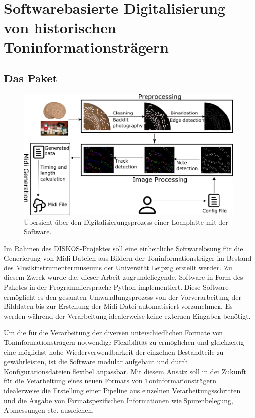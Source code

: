 \FloatBarrier

\section{Softwarebasierte Digitalisierung von historischen Toninformationsträgern}

\subsection{Das  Paket}

\begin{figure}[t]
    \centering
    \includegraphics[width=\textwidth]{graphics/flow_diagram.png}
    \caption{Übersicht über den Digitalisierungsprozess einer Lochplatte mit der  Software.}
    \label{softwareworkflow}
\end{figure}

Im Rahmen des DISKOS-Projektes soll eine einheitliche Softwarelösung für die Generierung von Midi-Dateien aus Bildern der Toninformationsträger im Bestand des Musikinstrumentenmuseums der Universität Leipzig erstellt werden.
Zu diesem Zweck wurde die, dieser Arbeit zugrundeliegende, Software in Form des  Paketes in der Programmiersprache Python \parencite[]{van1995python} implementiert.
Diese Software ermöglicht es den gesamten Umwandlungsprozess von der Vorverarbeitung der Bilddaten bis zur Erstellung der Midi-Datei automatisiert vorzunehmen.
Es werden während der Verarbeitung idealerweise keine externen Eingaben benötigt.

Um die für die Verarbeitung der diversen unterschiedlichen Formate von Toninformationsträgern notwendige Flexibilität zu ermöglichen und gleichzeitig eine möglichst hohe Wiederverwendbarkeit der einzelnen Bestandteile zu gewährleisten, ist die Software modular aufgebaut und durch Konfigurationsdateien flexibel anpassbar.
Mit diesem Ansatz soll in der Zukunft für die Verarbeitung eines neuen Formats von Toninformationsträgern idealerweise die Erstellung einer Pipeline aus einzelnen Verarbeitungsschritten und die Angabe von Formatspezifischen Informationen wie Spurenbelegung, Abmessungen etc. ausreichen.


